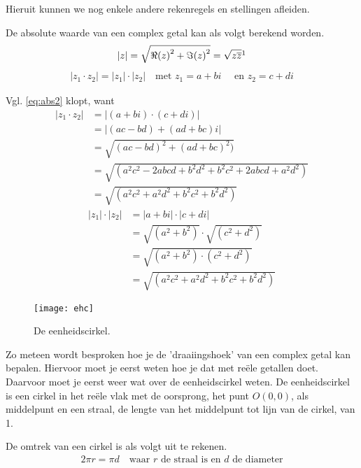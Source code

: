 \documentclass[11pt,fleqn]{book} %
\newcommand*\conj[1]{\overline{#1}}
\begin{document}
Hieruit kunnen we nog enkele andere rekenregels en stellingen afleiden.
\begin{theorem}
De absolute waarde van een complex getal kan als volgt berekend worden.
\begin{align}\label{eq:abs}
\left|z\right|=\sqrt{{\Re (z)}^2+{\Im (z)}^2}=\sqrt{z\conj{z}}\footnotemark
\end{align}
\begin{align}\label{eq:abs2}
|z_1\cdot z_2|=|z_1|\cdot |z_2|\quad\text{met } z_1=a+bi \quad\text{ en } z_2=c+di
\end{align}
\end{theorem}

Vgl. \ref{eq:abs2} klopt, want
\begin{align*}
|z_1\cdot z_2 |&=|(a+bi)\cdot(c+di)|\\&=|(ac-bd)+(ad+bc)i|\\&=\sqrt{(ac-bd)^2+(ad+bc)^2)}\\&=\sqrt{(a^2 c^2-2abcd+b^2 d^2+b^2 c^2+2abcd+a^2d^2)}\\&=\sqrt{(a^2 c^2+a^2 d^2+b^2 c^2+b^2d^2)}
\end{align*}
\begin{align*}
|z_1 |\cdot|z_2 |&=|a+bi|\cdot|c+di|\\&=\sqrt{(a^2+b^2 )}\cdot\sqrt{(c^2+d^2 )}\\&=\sqrt{(a^2+b^2 )\cdot(c^2+d^2 )}\\&=\sqrt{(a^2 c^2+a^2 d^2+b^2 c^2+b^2d^2)}
\end{align*}

\begin{figure}[h]
	\centering\texttt{[image: ehc]}
	\caption{De eenheidscirkel.}
	\label{fig:ehc}
\end{figure}

Zo meteen wordt besproken hoe je de 'draaiingshoek' van een complex getal kan bepalen. Hiervoor moet je eerst weten hoe je dat met reële getallen doet. Daarvoor moet je eerst weer wat over de eenheidscirkel weten. De eenheidscirkel is een cirkel in het reële vlak met de oorsprong, het punt $O(0,0)$, als middelpunt en een straal, de lengte van het middelpunt tot lijn van de cirkel, van 1.

\begin{definition}
De omtrek van een cirkel is als volgt uit te rekenen.
\begin{align}\label{eq:2pir}
2\pi r=\pi d \quad\text{waar } r \text{ de straal is en } d \text{ de diameter}
\end{align}
\end{definition}
\end{document}
